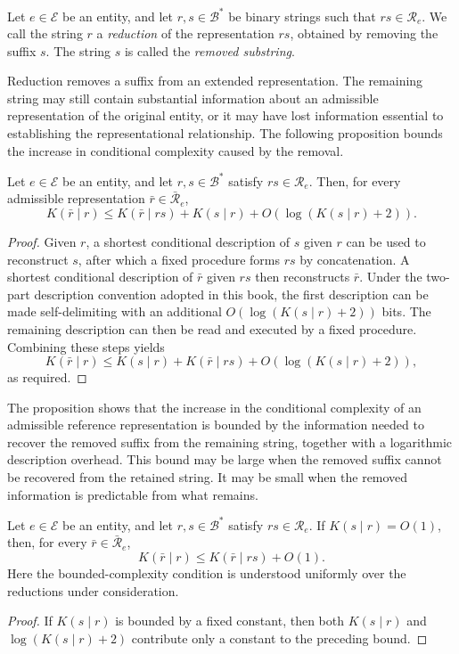 \begin{definition}
Let $e\in\mathcal{E}$ be an entity, and let $r,s\in\mathcal{B}^\ast$ be binary strings such that $rs\in\mathcal{R}_e$. We call the string $r$ a \emph{reduction} of the representation $rs$, obtained by removing the suffix $s$. The string $s$ is called the \emph{removed substring}.
\end{definition}

Reduction removes a suffix from an extended representation. The remaining string may still contain substantial information about an admissible representation of the original entity, or it may have lost information essential to establishing the representational relationship. The following proposition bounds the increase in conditional complexity caused by the removal.

\begin{proposition}
Let $e\in\mathcal{E}$ be an entity, and let $r,s\in\mathcal{B}^\ast$ satisfy $rs\in\mathcal{R}_e$. Then, for every admissible representation $\bar r\in\bar{\mathcal{R}}_e$,
\[
K(\bar r\mid r)
\leq K(\bar r\mid rs)+K(s\mid r)
+O\!\left(\log(K(s\mid r)+2)\right).
\]
\end{proposition}
\begin{proof}
Given $r$, a shortest conditional description of $s$ given $r$ can be used to reconstruct $s$, after which a fixed procedure forms $rs$ by concatenation. A shortest conditional description of $\bar r$ given $rs$ then reconstructs $\bar r$. Under the two-part description convention adopted in this book, the first description can be made self-delimiting with an additional $O(\log(K(s\mid r)+2))$ bits. The remaining description can then be read and executed by a fixed procedure. Combining these steps yields
\[
K(\bar r\mid r)
\leq K(s\mid r)+K(\bar r\mid rs)
+O\!\left(\log(K(s\mid r)+2)\right),
\]
as required.
\end{proof}

The proposition shows that the increase in the conditional complexity of an admissible reference representation is bounded by the information needed to recover the removed suffix from the remaining string, together with a logarithmic description overhead. This bound may be large when the removed suffix cannot be recovered from the retained string. It may be small when the removed information is predictable from what remains.

\begin{corollary}
Let $e\in\mathcal{E}$ be an entity, and let $r,s\in\mathcal{B}^\ast$ satisfy $rs\in\mathcal{R}_e$. If $K(s\mid r)=O(1)$, then, for every $\bar r\in\bar{\mathcal{R}}_e$,
\[
K(\bar r\mid r)\leq K(\bar r\mid rs)+O(1).
\]
Here the bounded-complexity condition is understood uniformly over the reductions under consideration.
\end{corollary}
\begin{proof}
If $K(s\mid r)$ is bounded by a fixed constant, then both $K(s\mid r)$ and $\log(K(s\mid r)+2)$ contribute only a constant to the preceding bound.
\end{proof}

